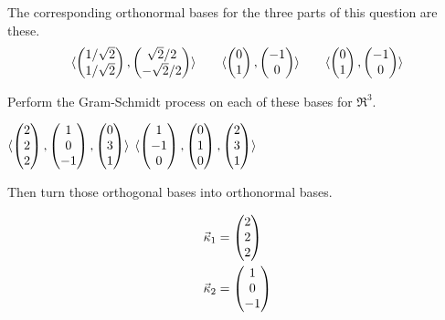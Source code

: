 \begin{exercises}
\begin{answer}
      The corresponding orthonormal bases for the three parts of this
      question are these.
      \begin{equation*}
        \langle
              \begin{pmatrix} 1/\sqrt{2} \\ 1/\sqrt{2} \end{pmatrix},
              \begin{pmatrix} \sqrt{2}/2 \\ -\sqrt{2}/2 \end{pmatrix}
              \rangle
        \qquad
        \langle
              \begin{pmatrix} 0 \\ 1 \end{pmatrix},
              \begin{pmatrix} -1 \\ 0 \end{pmatrix}
              \rangle
        \qquad
        \langle
              \begin{pmatrix} 0 \\ 1 \end{pmatrix},
              \begin{pmatrix} -1 \\ 0 \end{pmatrix}
              \rangle
      \end{equation*}
    \end{answer}
  \recommended \item 
    Perform the Gram-Schmidt process on each of these bases
    for $\Re^3$.
    \begin{exparts*}
      \partsitem \( \langle
                         \begin{pmatrix} 2 \\ 2 \\ 2 \end{pmatrix},
                         \begin{pmatrix} 1 \\ 0 \\ -1 \end{pmatrix},
                         \begin{pmatrix} 0 \\ 3 \\ 1 \end{pmatrix}
                         \rangle  \)
      \partsitem \( \langle
                         \begin{pmatrix} 1 \\ -1 \\ 0 \end{pmatrix},
                         \begin{pmatrix} 0 \\ 1 \\ 0 \end{pmatrix},
                         \begin{pmatrix} 2 \\ 3 \\ 1 \end{pmatrix}
                         \rangle  \)
    \end{exparts*}
    Then turn those orthogonal bases into orthonormal bases.
    \begin{answer} 
      \begin{exparts}
       \partsitem 
        \begin{align*}
          \vec{\kappa}_1 &= \colvec{2 \\ 2 \\ 2}           \\
          \vec{\kappa}_2
            &=
            \colvec{1 \\ 0 \\ -1}

\end{align*}
\end{exparts}
\end{answer}
\end{exercises}
